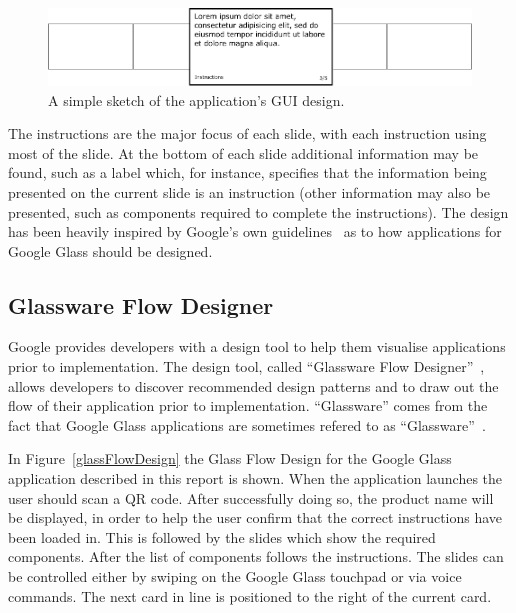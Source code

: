 	\begin{figure}[ht!]
		\centering
		\includegraphics[width=150mm]{images/cardDesign2}
		\caption{A simple sketch of the application's GUI design.}
		\label{cardDesign}
	\end{figure}

The instructions are the major focus of each slide, with each instruction using most of the slide. At the bottom of each slide additional information may be found, such as a label which, for instance, specifies that the information being presented on the current slide is an instruction (other information may also be presented, such as components required to complete the instructions). The design has been heavily inspired by Google's own guidelines~\cite{glassDesignPrinciples} as to how applications for Google Glass should be designed.

\subsection{Glassware Flow Designer}
Google provides developers with a design tool to help them visualise applications prior to implementation. The design tool, called ``Glassware Flow Designer''~\cite{glasswareFlowDesigner}, allows developers to discover recommended design patterns and to draw out the flow of their application prior to implementation. ``Glassware'' comes from the fact that Google Glass applications are sometimes refered to as ``Glassware''~\cite{glassware}.

In Figure~\ref{glassFlowDesign} the Glass Flow Design for the Google Glass application described in this report is shown. When the application launches the user should scan a QR code. After successfully doing so, the product name will be displayed, in order to help the user confirm that the correct instructions have been loaded in. This is followed by the slides which show the required components. After the list of components follows the instructions. The slides can be controlled either by swiping on the Google Glass touchpad or via voice commands. The next card in line is positioned to the right of the current card.

